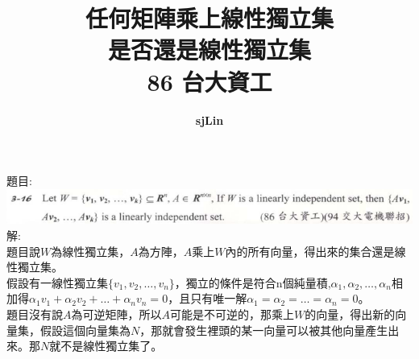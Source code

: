 \documentclass{article}
\title{任何矩陣乘上線性獨立集\\
是否還是線性獨立集\\
86 台大資工}
\author{\textbf{sjLin}}
\begin{document}
\begin{CJK*}{UTF8}{bkai}
{\selectfont
\maketitle
\noindent
題目:\\
\includegraphics[width=\textwidth]{./images/determine_independent_set.png}\\
解:\\
題目說$W$為線性獨立集，$A$為方陣，$A$乘上$W$內的所有向量，得出來的集合還是線性獨立集。\\
假設有一線性獨立集$\{v_1,v_2,\dots,v_n\}$，獨立的條件是符合n個純量積,$\alpha_1,\alpha_2,\dots,\alpha_n$相加得$\alpha_1v_1+\alpha_2v_2+\dots+\alpha_nv_n=0$，且只有唯一解$\alpha_1=\alpha_2=\dots=\alpha_n=0$。\\
題目沒有說$A$為可逆矩陣，所以$A$可能是不可逆的，那乘上$W$的向量，得出新的向量集，假設這個向量集為$N$，那就會發生裡頭的某一向量可以被其他向量產生出來。那$N$就不是線性獨立集了。

} %
\end{CJK*}
\end{document}
